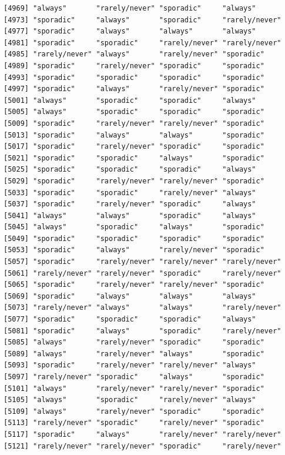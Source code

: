 \documentclass[
  letterpaper,
  DIV=11,
  numbers=noendperiod]{scrartcl}
\begin{document}
\begin{verbatim}
[4969] "always"       "rarely/never" "sporadic"     "always"      
[4973] "sporadic"     "always"       "sporadic"     "rarely/never"
[4977] "sporadic"     "always"       "always"       "always"      
[4981] "sporadic"     "sporadic"     "rarely/never" "rarely/never"
[4985] "rarely/never" "always"       "rarely/never" "sporadic"    
[4989] "sporadic"     "rarely/never" "sporadic"     "sporadic"    
[4993] "sporadic"     "sporadic"     "sporadic"     "sporadic"    
[4997] "sporadic"     "always"       "rarely/never" "sporadic"    
[5001] "always"       "sporadic"     "sporadic"     "always"      
[5005] "always"       "sporadic"     "sporadic"     "sporadic"    
[5009] "sporadic"     "rarely/never" "rarely/never" "sporadic"    
[5013] "sporadic"     "always"       "always"       "sporadic"    
[5017] "sporadic"     "rarely/never" "sporadic"     "sporadic"    
[5021] "sporadic"     "sporadic"     "always"       "sporadic"    
[5025] "sporadic"     "sporadic"     "sporadic"     "always"      
[5029] "sporadic"     "rarely/never" "rarely/never" "sporadic"    
[5033] "sporadic"     "sporadic"     "rarely/never" "always"      
[5037] "sporadic"     "rarely/never" "sporadic"     "always"      
[5041] "always"       "always"       "sporadic"     "always"      
[5045] "always"       "sporadic"     "always"       "sporadic"    
[5049] "sporadic"     "sporadic"     "sporadic"     "sporadic"    
[5053] "sporadic"     "always"       "rarely/never" "sporadic"    
[5057] "sporadic"     "rarely/never" "rarely/never" "rarely/never"
[5061] "rarely/never" "rarely/never" "sporadic"     "rarely/never"
[5065] "sporadic"     "rarely/never" "rarely/never" "sporadic"    
[5069] "sporadic"     "always"       "always"       "always"      
[5073] "rarely/never" "always"       "always"       "rarely/never"
[5077] "sporadic"     "sporadic"     "sporadic"     "always"      
[5081] "sporadic"     "always"       "sporadic"     "rarely/never"
[5085] "always"       "rarely/never" "sporadic"     "sporadic"    
[5089] "always"       "rarely/never" "always"       "sporadic"    
[5093] "sporadic"     "rarely/never" "rarely/never" "always"      
[5097] "rarely/never" "sporadic"     "always"       "sporadic"    
[5101] "always"       "rarely/never" "rarely/never" "sporadic"    
[5105] "always"       "sporadic"     "rarely/never" "always"      
[5109] "always"       "rarely/never" "sporadic"     "sporadic"    
[5113] "rarely/never" "sporadic"     "rarely/never" "sporadic"    
[5117] "sporadic"     "always"       "rarely/never" "rarely/never"
[5121] "rarely/never" "rarely/never" "sporadic"     "rarely/never"

\end{verbatim}
\end{document}
